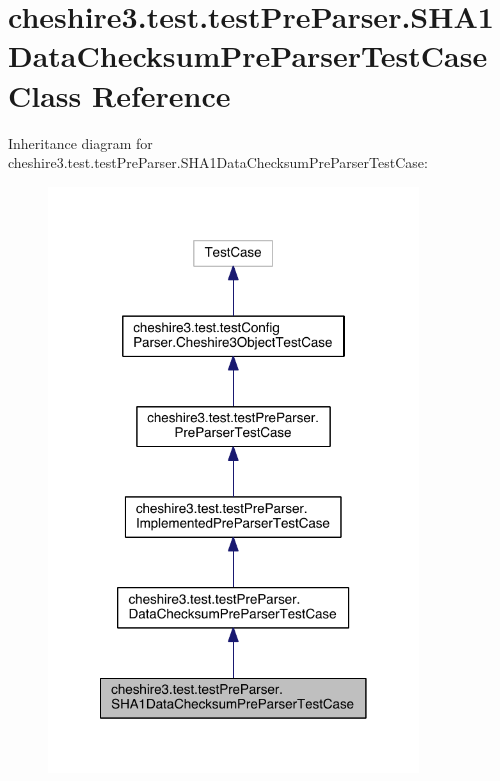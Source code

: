 \hypertarget{classcheshire3_1_1test_1_1test_pre_parser_1_1_s_h_a1_data_checksum_pre_parser_test_case}{\section{cheshire3.\-test.\-test\-Pre\-Parser.\-S\-H\-A1\-Data\-Checksum\-Pre\-Parser\-Test\-Case Class Reference}
\label{classcheshire3_1_1test_1_1test_pre_parser_1_1_s_h_a1_data_checksum_pre_parser_test_case}
}


Inheritance diagram for cheshire3.\-test.\-test\-Pre\-Parser.\-S\-H\-A1\-Data\-Checksum\-Pre\-Parser\-Test\-Case\-:
\nopagebreak
\begin{figure}[H]
\begin{center}
\leavevmode
\includegraphics[width=278pt]{classcheshire3_1_1test_1_1test_pre_parser_1_1_s_h_a1_data_checksum_pre_parser_test_case__inherit__graph}
\end{center}
\end{figure}


